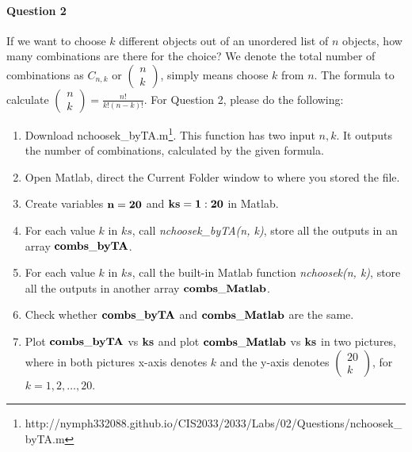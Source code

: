 \documentclass[11pt]{article} %
\begin{document}
\paragraph*{Question 2}
If we want to choose $k$ different objects out of an unordered list of $n$ objects, how many combinations are there for the choice? We denote the total number of combinations as $C_{n,k}$ or $\left(\begin{array}{c} n\\k\end{array} \right)$, simply means choose $k$ from $n$. The formula to calculate $\left( \begin{array}{c} n\\k \end{array} \right) = \frac{n!}{k!(n-k)!}$. For Question 2, please do the following:
\begin{enumerate}
\item Download nchoosek\_byTA.m\footnote{http://nymph332088.github.io/CIS2033/2033/Labs/02/Questions/nchoosek\_byTA.m}. This function has two input $n,k$. It outputs the number of combinations, calculated by  the given formula.
\item Open Matlab, direct the Current Folder window to where you stored the file.
\item Create variables $\bf n = 20$ and $\bf ks = 1:20$ in Matlab.
\item For each value $k$ in $ks$, call {\it nchoosek\_byTA(n, k)}, store all the outputs in an array $\bf combs\_byTA$.
\item For each value $k$ in $ks$, call the built-in Matlab function {\it nchoosek(n, k)}, store all the outputs in another array $\bf combs\_Matlab$. 
\item Check whether $\bf combs\_byTA$ and $\bf combs\_Matlab$ are the same.
\item Plot $\bf combs\_byTA$ vs $\bf ks$ and plot $\bf combs\_Matlab$ vs $\bf ks$ in two pictures, where in both pictures x-axis denotes $k$ and the y-axis denotes $\left( \begin{array}{c} 20\\k \end{array} \right)$, for $k = 1, 2, \ldots, 20$.
\end{enumerate}
\end{document}
